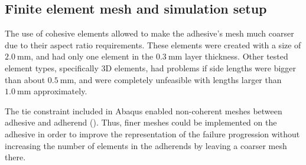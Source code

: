 \documentclass[cmfonts]{witpress}
\begin{document}
\subsection{Finite element mesh and simulation setup}

The use of cohesive elements allowed to make the adhesive's mesh much coarser due to their aspect ratio requirements. These elements were created with a size of $\SI{2.0}{\mm}$, and had only one element in the $\SI{0.3}{\mm}$ layer thickness. Other tested element types, specifically 3D elements, had problems if side lengths were bigger than about $\SI{0.5}{\mm}$, and were completely unfeasible with lengths larger than $\SI{1.0}{\mm}$ approximately.

The tie constraint included in Abaqus enabled non-coherent meshes between adhesive and adherend (). Thus, finer meshes could be implemented on the adhesive in order to improve the representation of the failure progression without increasing the number of elements in the adherends by leaving a coarser mesh there.
\end{document}
